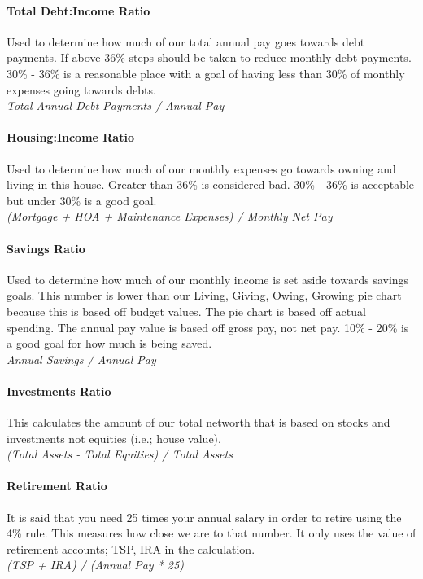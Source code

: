 \paragraph{Total Debt:Income Ratio} Used to determine how much of our total annual pay goes towards debt payments. If above 36\% steps should be taken to reduce monthly debt payments. 30\% - 36\% is a reasonable place with a goal of having less than 30\% of monthly expenses going towards debts. \\
\textit{Total Annual Debt Payments / Annual Pay}

\paragraph{Housing:Income Ratio} Used to determine how much of our monthly expenses go towards owning and living in this house. Greater than 36\% is considered bad. 30\% - 36\% is acceptable but under 30\% is a good goal.\\
\textit{(Mortgage + HOA + Maintenance Expenses) / Monthly Net Pay}

\paragraph{Savings Ratio} Used to determine how much of our monthly income is set aside towards savings goals. This number is lower than our Living, Giving, Owing, Growing pie chart because this is based off budget values. The pie chart is based off actual spending. The annual pay value is based off gross pay, not net pay. 10\% - 20\% is a good goal for how much is being saved.\\
\textit{Annual Savings / Annual Pay}

\paragraph{Investments Ratio} This calculates the amount of our total networth that is based on stocks and investments not equities (i.e.; house value). \\
\textit{(Total Assets - Total Equities) / Total Assets}

\paragraph{Retirement Ratio} It is said that you need 25 times your annual salary in order to retire using the 4\% rule. This measures how close we are to that number. It only uses the value of retirement accounts; TSP, IRA in the calculation. \\
\textit{(TSP + IRA) / (Annual Pay * 25)}

